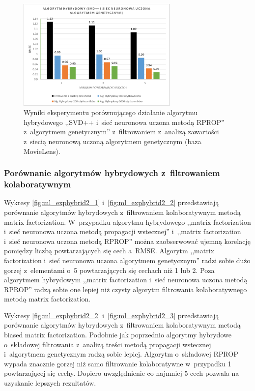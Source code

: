 \documentclass[twoside]{iisthesis}
\begin{document}
		\begin{figure}
			\centering
			\includegraphics[width=0.7\textwidth]{ml_exphybrid1_9}			
			\caption{Wyniki eksperymentu porównującego działanie algorytmu hybrydowego ,,SVD++ i~sieć neuronowa uczona metodą RPROP'' z~algorytmem genetycznym'' z~filtrowaniem z~analizą zawartości z~siecią neuronową uczoną algorytmem genetycznym (baza MovieLens).}
			\label{fig:ml_exphybrid1_9}
		\end{figure}
		
		\subsubsection{Porównanie algorytmów hybrydowych z~filtrowaniem kolaboratywnym}
		
		Wykresy \ref{fig:ml_exphybrid2_1} i~\ref{fig:ml_exphybrid2_2} przedstawiają porównanie algorytmów hybrydowych z~filtrowaniem kolaboratywnym metodą matrix factorization. W~przypadku algorytmu hybrydowego ,,matrix factorization i~sieć neuronowa uczona metodą propagacji wstecznej'' i~,,matrix factorization i~sieć neuronowa uczona metodą RPROP'' można zaobserwować ujemną korelację pomiędzy liczbą powtarzających się cech a~RMSE. Algorytm ,,matrix factorization i~sieć neuronowa uczona algorytmem genetycznym'' radzi sobie dużo gorzej z~elementami o~5 powtarzających się cechach niż 1 lub 2. Poza algorytmem hybrydowym ,,matrix factorization i~sieć neuronowa uczona metodą RPROP'' radzą sobie one lepiej niż czysty algorytm filtrowania kolaboratywnego metodą matrix factorization.
		
		Wykresy \ref{fig:ml_exphybrid2_2} i~\ref{fig:ml_exphybrid2_3} przedstawiają porównanie algorytmów hybrydowych z~filtrowaniem kolaboratywnym metodą biased matrix factorization. Podobnie jak poprzednio algorytmy hybrydowe o~składowej filtrowania z~analizą treści metodą propagacji wstecznej i~algorytmem genetycznym radzą sobie lepiej. Algorytm o~składowej RPROP wypada znacznie gorzej niż samo filtrowanie kolaboratywne w~przypadku 1 powtarzającej się cechy. Dopiero uwzględnienie co najmniej 5 cech pozwala na uzyskanie lepszych rezultatów.
		
\end{document}
